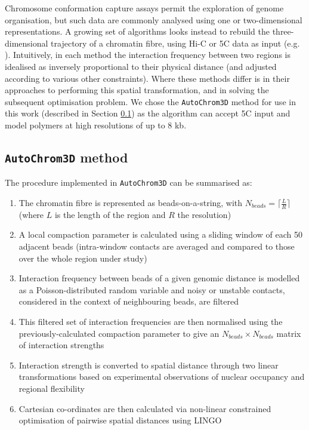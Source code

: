 \documentclass[a4paper,11pt,oneside]{book}
\begin{document}
Chromosome conformation capture assays permit the exploration of genome organisation, but such data are commonly analysed using one or two-dimensional representations. A growing set of algorithms looks instead to rebuild the three-dimensional trajectory of a chromatin fibre, using Hi-C or 5C data as input (e.g. ). Intuitively, in each method the interaction frequency between two regions is idealised as inversely proportional to their physical distance (and adjusted according to various other constraints). Where these methods differ is in their approaches to performing this spatial transformation, and in solving the subsequent optimisation problem. We chose the \texttt{AutoChrom3D} method\cite{Peng2013} for use in this work (described in Section \ref{sec:achrom}) as the algorithm can accept 5C input and model polymers at high resolutions of up to 8 kb.

\subsection{\texttt{AutoChrom3D} method}\label{sec:achrom}

The procedure implemented in \texttt{AutoChrom3D} can be summarised as:\cite{Peng2013}

\begin{enumerate}
\item The chromatin fibre is represented as beads-on-a-string, with $N_{beads} = \lceil\frac{L}{R}\rceil$ (where $L$ is the length of the region and $R$ the resolution)
\item A local compaction parameter is calculated using a sliding window of each 50 adjacent beads (intra-window contacts are averaged and compared to those over the whole region under study)
\item Interaction frequency between beads of a given genomic distance is modelled as a Poisson-distributed random variable and noisy or unstable contacts, considered in the context of neighbouring beads, are filtered
\item This filtered set of interaction frequencies are then normalised using the previously-calculated compaction parameter to give an $N_{beads} \times N_{beads}$ matrix of interaction strengths
\item Interaction strength is converted to spatial distance through two linear transformations based on experimental observations of nuclear occupancy and regional flexibility\cite{Kalhor2012}
\item Cartesian co-ordinates are then calculated via non-linear constrained optimisation of pairwise spatial distances using LINGO\cite{lingo}
\end{enumerate}
\end{document}
